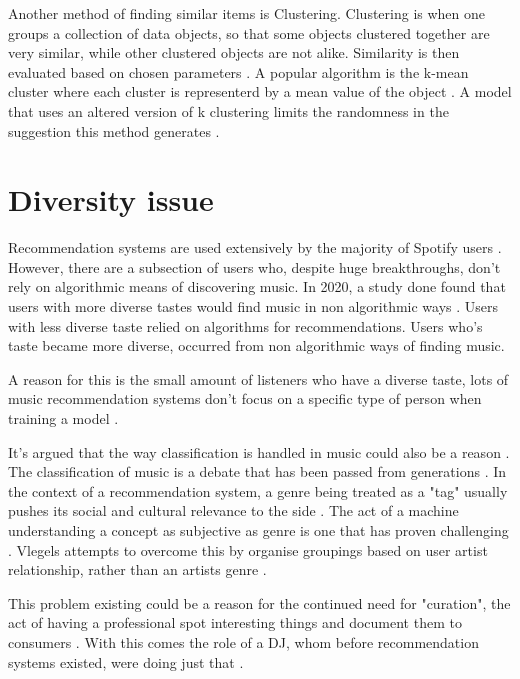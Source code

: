 Another method of finding similar items is Clustering. Clustering is when one  groups a collection of data objects, so that some objects clustered together are very similar, while other clustered objects are not alike. Similarity is then evaluated based on chosen parameters \citep{ferretti_clustering_2018}. A popular algorithm is the k-mean cluster where each cluster is representerd by a mean value of the object \citep{han_data_2006}. A model that uses an altered version of k clustering limits the randomness in the suggestion this method generates \citep{chang_personalized_2017}.


\section{Diversity issue}

Recommendation systems are used extensively by the majority of Spotify users \citep{spotify_spotify_2020}. However, there are a subsection of users who, despite huge breakthroughs, don't rely on algorithmic means of discovering music. In 2020, a study done found that users with more diverse tastes would find music in non algorithmic ways \citep{anderson_algorithmic_2020}. Users with less diverse taste relied on algorithms for recommendations. Users who's taste became more diverse, occurred from non algorithmic ways of finding music.

A reason for this is the small amount of listeners who have a diverse taste, lots of music recommendation systems don't focus on a specific type of person when training a model \citep{laplante_improving_2014}.

It's argued that the way classification is handled in music could also be a reason \citep{porcaro_diversity_2021}. The classification of music is a debate that has been passed from generations \citep{moles_sociodynamique_2019, dimaggio_classification_1987, bourdieu_distinction_2010}. In the context of a recommendation system, a genre being treated as a "tag" usually pushes its social and cultural relevance to the side \citep{porcaro_diversity_2021}. The act of a machine understanding a concept as subjective as genre is one that has proven challenging \citep{nurnberger_survey_2014}. Vlegels attempts to overcome this by organise groupings based on user artist relationship, rather than an artists genre \citep{vlegels_music_2017}.

This problem existing could be a reason for the continued need for "curation", the act of having a professional spot interesting things and document them to consumers \citep{barna_perfect_2017}. With this comes the role of a DJ, whom before recommendation systems existed, were doing just that \citep{percival_music_2011}. 

